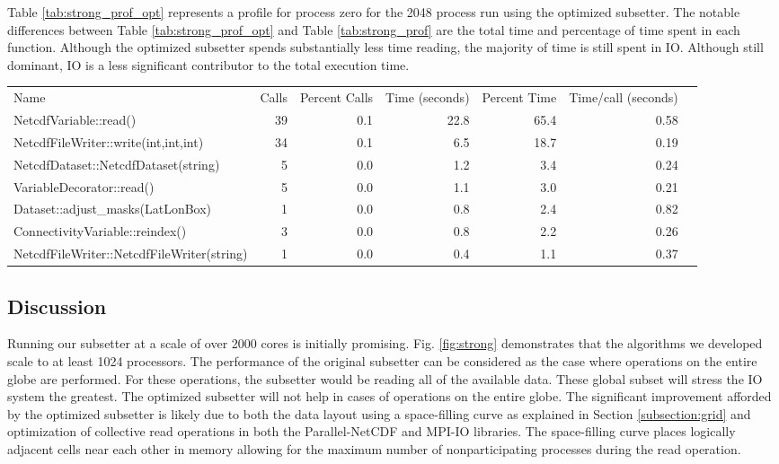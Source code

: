 Table \ref{tab:strong_prof_opt} represents a profile for process zero for the
2048 process run using the optimized subsetter.  The notable differences
between Table \ref{tab:strong_prof_opt} and Table \ref{tab:strong_prof} are
the total time and percentage of time spent in each function.  Although the
optimized subsetter spends substantially less time reading, the majority of
time is still spent in IO.  Although still dominant, IO is a less significant
contributor to the total execution time.

\begin{table*}[!t]
\center
\caption{Partial Profile for Process 0 at 2048 Cores - MJO Region - Optimized}
\label{tab:strong_prof_opt}
\begin{tabular}{lrrrrrr}
Name&Calls&Percent Calls&Time (seconds)&Percent Time&Time/call (seconds)\\
NetcdfVariable::read()                    & 39&0.1&22.8&65.4&0.58\\
NetcdfFileWriter::write(int,int,int)      & 34&0.1& 6.5&18.7&0.19\\
NetcdfDataset::NetcdfDataset(string)      &  5&0.0& 1.2& 3.4&0.24\\
VariableDecorator::read()                 &  5&0.0& 1.1& 3.0&0.21\\
Dataset::adjust\_masks(LatLonBox)         &  1&0.0& 0.8& 2.4&0.82\\
ConnectivityVariable::reindex()           &  3&0.0& 0.8& 2.2&0.26\\
NetcdfFileWriter::NetcdfFileWriter(string)&  1&0.0& 0.4& 1.1&0.37\\
\end{tabular}
\end{table*}

\subsection{Discussion}

Running our subsetter at a scale of over 2000 cores is initially promising.
Fig. \ref{fig:strong} demonstrates that the algorithms we developed scale
to at least 1024 processors.  The performance of the original subsetter
can be considered as the case where operations on the entire globe are
performed. For these operations, the subsetter would be reading
all of the available data.  These global subset will stress the IO system
the greatest.  The optimized subsetter will not help in cases of operations on
the entire globe.  The significant improvement
afforded by the optimized subsetter is likely due to both the data layout using a
space-filling curve as explained in Section \ref{subsection:grid} and
optimization of collective read operations in both the Parallel-NetCDF and
MPI-IO libraries.  The
space-filling curve places logically adjacent cells near each other in memory
allowing for the maximum number of nonparticipating processes during the read
operation.

